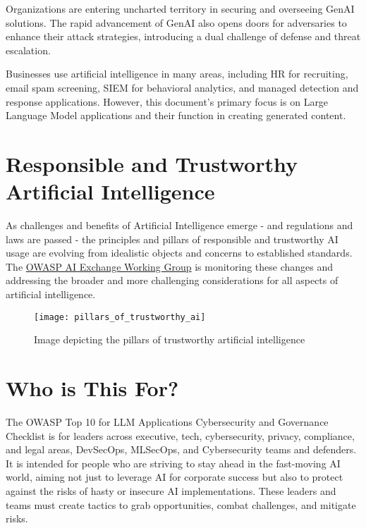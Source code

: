 Organizations are entering uncharted territory in securing and overseeing GenAI
solutions. The rapid advancement of GenAI also opens doors for adversaries to
enhance their attack strategies, introducing a dual challenge of defense and
threat escalation.

\clearpage

Businesses use artificial intelligence in many areas, including HR for
recruiting, email spam screening, SIEM for behavioral analytics, and managed
detection and response applications. However, this document's primary focus is
on Large Language Model applications and their function in creating generated
content.

\section{Responsible and Trustworthy Artificial Intelligence}
As challenges and benefits of Artificial Intelligence emerge - and regulations
and laws are passed - the principles and pillars of responsible and trustworthy
AI usage are evolving from idealistic objects and concerns to established
standards. The \href{https://owasp-ai-exchange.web.app/}{OWASP AI Exchange Working Group}
is monitoring these changes and addressing the broader and more challenging
considerations for all aspects of artificial intelligence.

\begin{figure}[h]
  \centering
  \texttt{[image: pillars\_of\_trustworthy\_ai]}
  \caption{Image depicting the pillars of trustworthy artificial intelligence}
  \label{fig:pillars-of-trustworthy-ai}
\end{figure}

\clearpage

\section{Who is This For?}
The OWASP Top 10 for LLM Applications Cybersecurity and Governance Checklist is
for leaders across executive, tech, cybersecurity, privacy, compliance, and
legal areas, DevSecOps, MLSecOps, and Cybersecurity teams and defenders. It is
intended for people who are striving to stay ahead in the fast-moving AI world,
aiming not just to leverage AI for corporate success but also to protect against
the risks of hasty or insecure AI implementations. These leaders and teams must
create tactics to grab opportunities, combat challenges, and mitigate risks.

